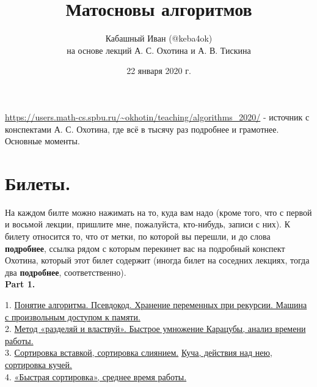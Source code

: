 \documentclass[a4paper]{article}
\title{Матосновы алгоритмов}
\author{Кабашный Иван (@keba4ok) \\ на основе лекций А. С. Охотина и А. В. Тискина}
\date{22 января 2020 г.}
\theoremstyle{indented}
\theoremstyle{definition}
\theoremstyle{remark}
\begin{document}
\newcommand{\resetexlcounters}{%
  \setcounter{exl}{0}%
} 

\newcommand{\resetremarkcounters}{%
  \setcounter{remark}{0}%
} 

\newcommand{\reseconscounters}{%
  \setcounter{cons}{0}%
} 

\newcommand{\resetall}{%
    \resetexlcounters
    \resetremarkcounters
    \reseconscounters%
}



\maketitle 

\newpage

\url{https://users.math-cs.spbu.ru/~okhotin/teaching/algorithms_2020/} - источник с конспектами А. С. Охотина, где всё в тысячу раз подробнее и грамотнее. \\

\hypertarget{t1}{Основные моменты}. 
\tableofcontents

\newpage

\section{Билеты.}

На каждом билте можно нажимать на то, куда вам надо (кроме того, что с первой и восьмой лекции, пришлите мне, пожалуйста, кто-нибудь, записи с них). К билету относится то, что от метки, по которой вы перешли, и до слова \textbf{подробнее}, ссылка рядом с которым перекинет вас на подробный конспект Охотина, который этот билет содержит (иногда билет на соседних лекциях, тогда два \textbf{подробнее}, соответственно). \\

\textbf{Part 1.} \ 

1. \hyperlink{d-1}{Понятие алгоритма. Псевдокод. Хранение переменных при рекурсии. Машина с произвольным доступом к памяти.} \\

2. \hyperlink{t-1}{Метод «разделяй и властвуй». Быстрое умножение Карацубы, анализ времени работы.} \\ 

3. \hyperlink{t-3}{Сортировка вставкой, сортировка слиянием.} \hyperlink{d1.5}{Куча, действия над нею, сортировка кучей.} \\ 

4. \hyperlink{r1}{«Быстрая сортировка», среднее время работы.} \\ 
\end{document}
